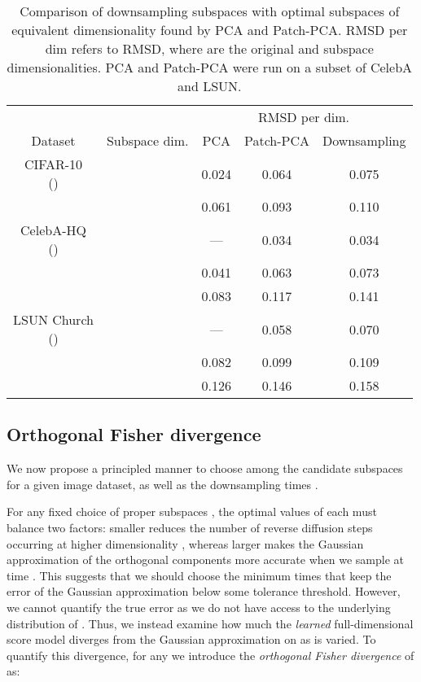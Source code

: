 \documentclass{article}
\begin{document}
\begin{table}[t!]
    \centering
    \begin{tabular}{ccccc}  
    \toprule
    & & \multicolumn{3}{c}{RMSD per dim.}\\ \cmidrule{3-5}
    Dataset  & Subspace dim. & PCA & Patch-PCA & Downsampling \\ \midrule
    \multirowcell{2}{CIFAR-10 \\ ()}   
    &  & 0.024 & 0.064 & 0.075\\
    &   & 0.061 & 0.093 & 0.110\\    \midrule
    \multirowcell{3}{CelebA-HQ \\ ()}
    &  & --- & 0.034 & 0.034\\
    &   & 0.041 & 0.063 & 0.073\\
    &   & 0.083 & 0.117 & 0.141\\ 
    \midrule
    \multirowcell{3}{LSUN Church \\ ()}
    &  & --- & 0.058 & 0.070\\
    &   & 0.082 & 0.099 & 0.109\\ 
    &   & 0.126 & 0.146 & 0.158\\ 
    \bottomrule
    \end{tabular}
    \caption{Comparison of downsampling subspaces with optimal subspaces of equivalent dimensionality found by PCA and Patch-PCA. RMSD per dim refers to RMSD, where  are the original and subspace dimensionalities. PCA and Patch-PCA were run on a subset of CelebA and LSUN.}
    \label{tab:pca}
\end{table}

\subsection{Orthogonal Fisher divergence} \label{sec:fisher}

We now propose a principled manner to choose among the candidate subspaces for a given image dataset, as well as the downsampling times .

For any fixed choice of proper subspaces , the optimal values of each  must balance two factors: smaller  reduces the number of reverse diffusion steps occurring at higher dimensionality , whereas larger  makes the Gaussian approximation of the orthogonal components  more accurate when we sample at time . This suggests that we should choose the minimum times that keep the error of the Gaussian approximation below some tolerance threshold. However, we cannot quantify the true error as we do not have access to the underlying distribution of . Thus, we instead examine how much the \emph{learned} full-dimensional score model  diverges from the Gaussian approximation on  as  is varied. To quantify this divergence, for any  we introduce the \emph{orthogonal Fisher divergence} of  as:
\end{document}
